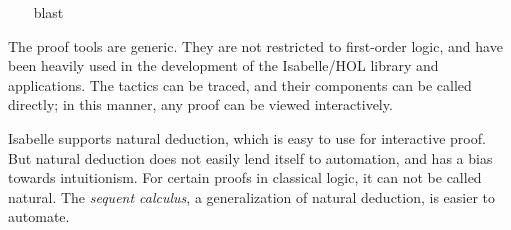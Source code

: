 \begin{isabellebody}
%
\isadelimproof
\ \ %
\endisadelimproof
%
\isatagproof
{}\isamarkupfalse%
\ blast%
\endisatagproof
{\isafoldproof}%
%
\isadelimproof
%
\endisadelimproof
%
\begin{isamarkuptext}%
The proof tools are generic.  They are not restricted to
  first-order logic, and have been heavily used in the development of
  the Isabelle/HOL library and applications.  The tactics can be
  traced, and their components can be called directly; in this manner,
  any proof can be viewed interactively.%
\end{isamarkuptext}%
\isamarkuptrue%
%
\isamarkuptrue%
%
\begin{isamarkuptext}%
Isabelle supports natural deduction, which is easy to use for
  interactive proof.  But natural deduction does not easily lend
  itself to automation, and has a bias towards intuitionism.  For
  certain proofs in classical logic, it can not be called natural.
  The \emph{sequent calculus}, a generalization of natural deduction,
  is easier to automate.


\end{isamarkuptext}
\end{isabellebody}
